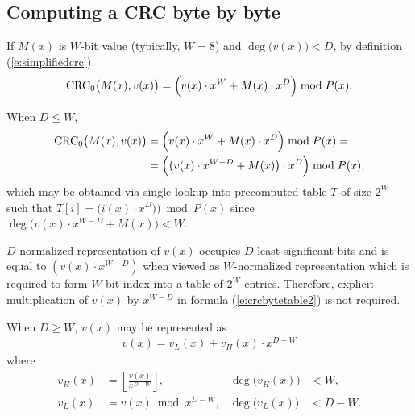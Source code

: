 \documentclass{article}
\begin{document}
\subsection{Computing a CRC byte by byte} \label{s:crcbyte}

If $M(x)$ is $W$-bit value (typically, $W=8$) and
$\deg\bigl(v(x)\bigr) < D$, by definition (\ref{e:simplifiedcrc})
  \begin{align*}
    {\rm CRC}_0\bigl(M(x), v(x)\bigr)
      = \Bigl(v(x) \cdot x^W + M(x) \cdot x^D\Bigr) \bmod P(x).
  \end{align*}

When $D \leq W$,
\begin{align}
  {\rm CRC}_0\bigl(M(x), v(x)\bigr)
    &= \Bigl(v(x) \cdot x^W + M(x) \cdot x^D\Bigr) \bmod P(x) = \nonumber \\
    &= \Bigl(\bigl(v(x) \cdot x^{W-D} + M(x)\bigr) \cdot x^D\Bigr) \bmod P(x), \label{e:crcbytetable2}
\end{align}
which may be obtained via single lookup into precomputed table $T$ of size
$2^W$ such that $T[i] = \bigl(i(x) \cdot x^D)\bigr) \bmod P(x)$ since
$\deg\bigl(v(x) \cdot x^{W-D} + M(x)\bigr) < W$.

$D$-normalized representation of $v(x)$ occupies $D$ least significant bits
and is equal to $\left(v(x) \cdot x^{W-D}\right)$ when viewed as
$W$-normalized representation which is required to form $W$-bit index into
a table of $2^W$ entries. Therefore, explicit multiplication of $v(x)$ by
$x^{W-D}$ in formula (\ref{e:crcbytetable2}) is not required.

When $D \geq W$, $v(x)$ may be represented as
  \begin{align*}
    v(x) = v_L(x) + v_H(x) \cdot x^{D-W}
  \end{align*}
where
  \begin{align*}
    v_H(x) &= \left\lfloor\frac{v(x)}{x^{D-W}}\right\rfloor,
        &\deg\bigl(v_H(x)\bigr) &< W, \\
    v_L(x) &= v(x) \bmod x^{D-W},
        &\deg\bigl(v_L(x)\bigr) &< D-W.
  \end{align*}
\end{document}

